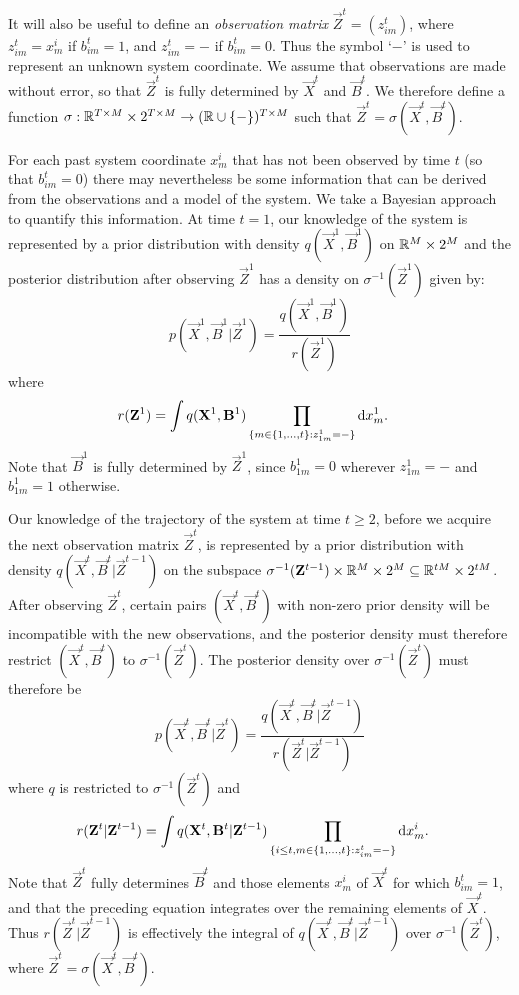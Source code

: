It will also be useful to define an {\em observation matrix} $\vec{Z}^t = (z^t_{im})$, where $z^t_{im} = x^i_m$ if $b^t_{im} = 1$, and $z^t_{im} = -$ if $b^t_{im} = 0$. Thus the symbol `$-$' is used to represent an unknown system coordinate. We assume that observations are made without error, so that $\vec{Z}^t$ is fully determined by $\vec{X}^t$ and $\vec{B}^t$. We therefore define a function $\sigma: \mathbb R^{T \times M} \times 2^{T \times M} \rightarrow (\mathbb R \cup \{ - \})^{T \times M}$ such that $\vec{Z}^t = \sigma(\vec{X}^t, \vec{B}^t)$.

For each past system coordinate $x^i_m$ that has not been observed by time $t$ (so that $b^t_{im} = 0$) there may nevertheless be some information that can be derived from the observations and a model of the system. We take a Bayesian approach to quantify this information. At time $t=1$, our knowledge of the system is represented by a prior distribution with density $q(\vec{X}^1, \vec{B}^1)$ on $\mathbb R^M \times 2^M$ and the posterior distribution after observing $\vec{Z}^1$ has a density on $\sigma^{-1}(\vec{Z}^1)$ given by:
\begin{equation*}
    p(\vec{X}^1, \vec{B}^1 |\vec{Z}^1) =
        \frac{q(\vec{X}^1, \vec{B}^1)}
        {r(\vec{Z}^1)} 
\end{equation*}
where
\begin{align*}
    r(\mathbf{Z}^1)  &= \int q(\mathbf{X}^1, \mathbf{B}^1) \prod_{ \{m \in \{1, \ldots, t \} : z^1_{1m} = - \} } \mathrm{d} x^1_m.
\end{align*}
Note that $\vec{B}^1$ is fully determined by $\vec{Z}^1$, since $b^1_{1m} = 0$ wherever $z^1_{1m} = -$ and $b^1_{1m} = 1$ otherwise.

Our knowledge of the trajectory of the system at time $t \geq 2$, before we acquire the next observation matrix $\vec{Z}^t$, is represented by a prior distribution with density $q(\vec{X}^t, \vec{B}^t | \vec{Z}^{t-1})$ on the subspace $\sigma^{-1}(\mathbf{Z}^{t-1}) \times \mathbb R^M \times 2^M \subseteq \mathbb R^{tM} \times 2^{tM}$. After observing $\vec{Z}^t$, certain pairs $(\vec{X}^t, \vec{B}^t)$ with non-zero prior density will be incompatible with the new observations, and the posterior density must therefore restrict $(\vec{X}^t, \vec{B}^t)$ to $\sigma^{-1}(\vec{Z}^t)$. The posterior density over $\sigma^{-1}(\vec{Z}^t)$ must therefore be
\begin{equation*}
    p(\vec{X}^t, \vec{B}^t |\vec{Z}^t) =
        \frac{q(\vec{X}^t, \vec{B}^t | \vec{Z}^{t-1})}
        {r(\vec{Z}^t | \vec{Z}^{t-1})} 
\end{equation*}
where $q$ is restricted to $\sigma^{-1}(\vec{Z}^t)$ and
\begin{align*}
    r(\mathbf{Z}^t | \mathbf{Z}^{t-1})  &= \int q(\mathbf{X}^t, \mathbf{B}^t | \mathbf{Z}^{t-1}) \prod_{ \{ i \leq t, m \in \{1, \ldots, t \} : z^t_{im} = - \} } \mathrm{d} x^i_m.
\end{align*}
Note that $\vec{Z}^t$ fully determines $\vec{B}^t$ and those elements $x_m^i$ of $\vec{X}^t$ for which $b_{im}^t = 1$, and that the preceding equation integrates over the remaining elements of $\vec{X}^t$. Thus $r(\vec{Z}^t | \vec{Z}^{t-1})$ is effectively the integral of $q(\vec{X}^t, \vec{B}^t | \vec{Z}^{t-1})$ over $\sigma^{-1}(\vec{Z}^t)$, where $\vec{Z}^{t} = \sigma(\vec{X}^t, \vec{B}^t)$.

